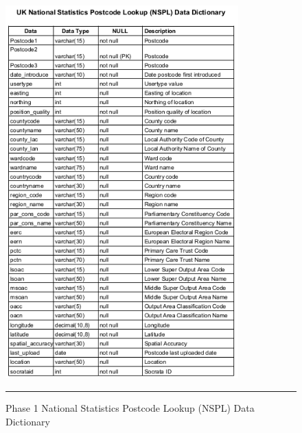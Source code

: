 \begin{figure}[H]
	\centering
	\includegraphics[width=0.8\textwidth]{Data-Dictionary/NSPL-data-dictionary.png}
	\rule{35em}{0.5pt}
	\caption[Phase 1 National Statistics Postcode Lookup (NSPL) Data Dictionary]{Phase 1 National Statistics Postcode Lookup (NSPL) Data Dictionary}
	
\end{figure}

